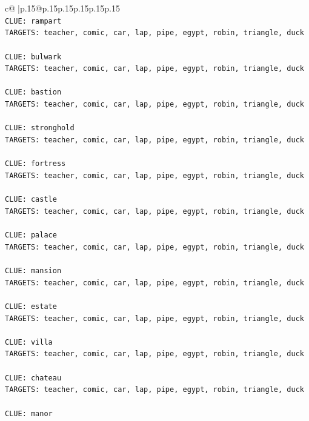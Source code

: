 \documentclass{article}
\begin{document}
{\begin{supertabular}{c@{$\;$}|p{.15\linewidth}@{}p{.15\linewidth}p{.15\linewidth}p{.15\linewidth}p{.15\linewidth}p{.15\linewidth}}
{{{\\ 
\texttt{CLUE: rampart} \\
\texttt{TARGETS: teacher, comic, car, lap, pipe, egypt, robin, triangle, duck} \\
\\ 
\texttt{CLUE: bulwark} \\
\texttt{TARGETS: teacher, comic, car, lap, pipe, egypt, robin, triangle, duck} \\
\\ 
\texttt{CLUE: bastion} \\
\texttt{TARGETS: teacher, comic, car, lap, pipe, egypt, robin, triangle, duck} \\
\\ 
\texttt{CLUE: stronghold} \\
\texttt{TARGETS: teacher, comic, car, lap, pipe, egypt, robin, triangle, duck} \\
\\ 
\texttt{CLUE: fortress} \\
\texttt{TARGETS: teacher, comic, car, lap, pipe, egypt, robin, triangle, duck} \\
\\ 
\texttt{CLUE: castle} \\
\texttt{TARGETS: teacher, comic, car, lap, pipe, egypt, robin, triangle, duck} \\
\\ 
\texttt{CLUE: palace} \\
\texttt{TARGETS: teacher, comic, car, lap, pipe, egypt, robin, triangle, duck} \\
\\ 
\texttt{CLUE: mansion} \\
\texttt{TARGETS: teacher, comic, car, lap, pipe, egypt, robin, triangle, duck} \\
\\ 
\texttt{CLUE: estate} \\
\texttt{TARGETS: teacher, comic, car, lap, pipe, egypt, robin, triangle, duck} \\
\\ 
\texttt{CLUE: villa} \\
\texttt{TARGETS: teacher, comic, car, lap, pipe, egypt, robin, triangle, duck} \\
\\ 
\texttt{CLUE: chateau} \\
\texttt{TARGETS: teacher, comic, car, lap, pipe, egypt, robin, triangle, duck} \\
\\ 
\texttt{CLUE: manor} \\
}}}
\end{supertabular}}
\end{document}
